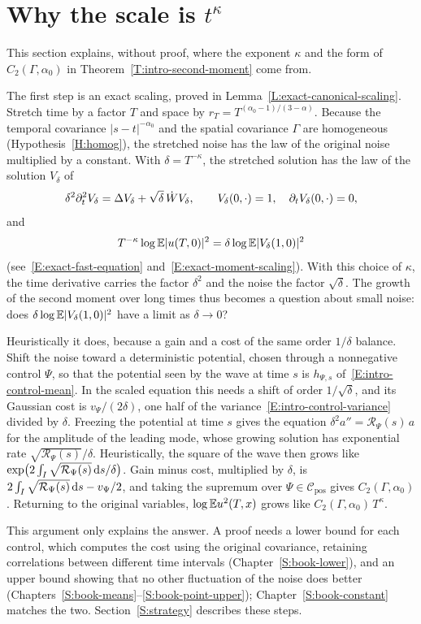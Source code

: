 \section{Why the scale is \texorpdfstring{$t^\kappa$}{t to the kappa}}\label{S:why-kappa}

This section explains, without proof, where the exponent $\kappa$ and the form
of $C_2(\Gamma,\alpha_0)$ in Theorem~\ref{T:intro-second-moment} come from.



The first step is an exact scaling, proved in
Lemma~\ref{L:exact-canonical-scaling}. Stretch time by a factor $T$ and space
by $r_T=T^{(\alpha_0-1)/(3-\alpha)}$. Because the temporal covariance
$|s-t|^{-\alpha_0}$ and the spatial covariance $\Gamma$ are homogeneous
(Hypothesis~\ref{H:homog}), the stretched noise has the law of the original
noise multiplied by a constant. With $\delta=T^{-\kappa}$, the stretched
solution has the law of the solution $V_\delta$ of
\[
  \delta^2\partial_t^2V_\delta=\Delta V_\delta+\sqrt\delta\,\dot W V_\delta,
  \qquad V_\delta(0,\cdot)=1,\quad \partial_tV_\delta(0,\cdot)=0,
\]
and
\[
  T^{-\kappa}\log\mathbb{E}|u(T,0)|^2=\delta\log\mathbb{E}|V_\delta(1,0)|^2
\]
(see~\eqref{E:exact-fast-equation} and~\eqref{E:exact-moment-scaling}). With
this choice of $\kappa$, the time derivative carries the factor $\delta^2$ and
the noise the factor $\sqrt\delta$. The growth of the second moment over long
times thus becomes a question about small noise: does
$\delta\log\mathbb{E}|V_\delta(1,0)|^2$ have a limit as $\delta\to0$?

Heuristically it does, because a gain and a cost of the same order $1/\delta$
balance. Shift the noise toward a deterministic potential, chosen through a
nonnegative control $\Psi$, so that the potential seen by the wave at time $s$
is $h_{\Psi,s}$ of~\eqref{E:intro-control-mean}. In the scaled equation this
needs a shift of order $1/\sqrt\delta$, and its Gaussian cost is $v_\Psi/(2\delta)$,
one half of the variance~\eqref{E:intro-control-variance} divided by $\delta$.
Freezing the potential at time $s$ gives the equation
$\delta^2a''=\mathcal{R}_\Psi(s)\,a$ for the amplitude of the leading mode,
whose growing solution has exponential rate $\sqrt{\mathcal{R}_\Psi(s)}/\delta$.
Heuristically, the square of the wave then grows like
$\exp\bigl(2\int_I\sqrt{\mathcal{R}_\Psi(s)}\,\mathrm{d} s/\delta\bigr)$. Gain minus
cost, multiplied by $\delta$, is
$2\int_I\sqrt{\mathcal{R}_\Psi(s)}\,\mathrm{d} s-v_\Psi/2$, and taking the supremum over $\Psi\in\mathcal{C}_{\mathrm{pos}}$ gives
$C_2(\Gamma,\alpha_0)$. Returning to the original variables,
$\log\mathbb{E} u^2(T,x)$ grows like $C_2(\Gamma,\alpha_0)\,T^\kappa$.

This argument only explains the answer. A proof needs a lower bound for each
control, which computes the cost using the original covariance, retaining correlations between different time intervals
(Chapter~\ref{S:book-lower}), and an upper bound showing that no other
fluctuation of the noise does better (Chapters~\ref{S:book-means}--\ref{S:book-point-upper});
Chapter~\ref{S:book-constant} matches the two. Section~\ref{S:strategy} describes
these steps.
